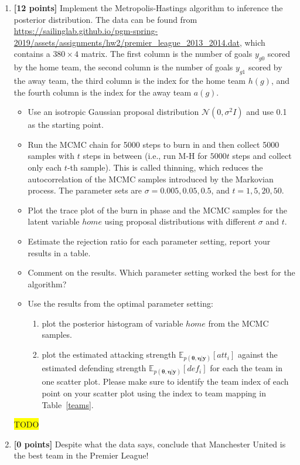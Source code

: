 \documentclass[10pt]{article}
\newcommand{\hilight}[1]{\colorbox{yellow}{#1}}
\begin{document}
\begin{enumerate}
    \item \textbf{[12 points]} Implement the Metropolis-Hastings algorithm to inference the posterior distribution. The data can be found from \url{https://sailinglab.github.io/pgm-spring-2019/assets/assignments/hw2/premier_league_2013_2014.dat}, which contains a $380 \times 4$ matrix. The first column is the number of goals $y_{g0}$ scored by the home team, the second column is the number of goals $y_{g1}$ scored by the away team, the third column is the index for the home team $h(g)$, and the fourth column is the index for the away team $a(g)$.
    \begin{itemize}
        \item Use an isotropic Gaussian proposal distribution $\mathcal{N}(0,\sigma^2I)$ and use \color{red} 0.1 \color{black} as the starting point.
        \item Run the MCMC chain for 5000 steps to burn in and then collect 5000 samples with $t$ steps in between (i.e., run M-H for $5000t$ steps and collect only each $t$-th sample). This is called thinning, which reduces the autocorrelation of the MCMC samples introduced by the Markovian process. The parameter sets are $\sigma = 0.005, 0.05, 0.5$, and $t = 1, 5, 20, 50$.
        \item Plot the trace plot of the burn in phase and the MCMC samples for the latent variable $home$ using proposal distributions with different $\sigma$ and $t$.
        \item Estimate the rejection ratio for each parameter setting, report your results in a table.
        \item Comment on the results. Which parameter setting worked the best for the algorithm?
        \item Use the results from the optimal parameter setting:
        \begin{enumerate}
            \item plot the posterior histogram of variable $home$ from the MCMC samples.
            \item plot the estimated attacking strength $\mathbb{E}_{p(\boldsymbol{\theta},\boldsymbol{\eta}|\mathbf{y})} [att_i]$ against the estimated defending strength $\mathbb{E}_{p(\boldsymbol{\theta},\boldsymbol{\eta}|\mathbf{y})} [def_i]$ for each the team in one scatter plot. Please make sure to identify the team index of each point on your scatter plot using the index to team mapping in Table~\ref{teams}.
        \end{enumerate}
    \end{itemize}

\begin{solution}
\hilight{TODO}
\end{solution}

    \item \textbf{[0 points]} Despite what the data says, conclude that Manchester United is the best team in the Premier League!

\end{enumerate}
\end{document}
